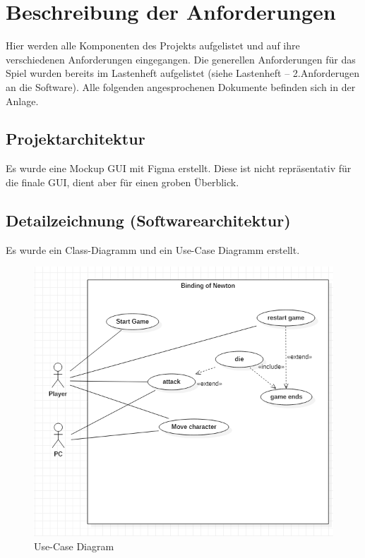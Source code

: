 \documentclass[12pt]{article}
\begin{document}
\section{Beschreibung der Anforderungen}
Hier werden alle Komponenten des Projekts aufgelistet und auf ihre verschiedenen Anforderungen eingegangen. Die generellen Anforderungen für das Spiel wurden bereits im Lastenheft aufgelistet (siehe Lastenheft – 2.Anforderugen an die Software). Alle folgenden angesprochenen Dokumente befinden sich in der Anlage.

\subsection{Projektarchitektur}
Es wurde eine Mockup GUI mit Figma erstellt. Diese ist nicht repräsentativ für die finale GUI, dient aber für einen groben Überblick.

\subsection{Detailzeichnung (Softwarearchitektur)}
Es wurde ein Class-Diagramm und ein Use-Case Diagramm erstellt.

\begin{figure}[H]
    \centering
    \caption{Use-Case Diagram}
    \includegraphics[scale=0.5]{case.png}
\end{figure}
\end{document}
